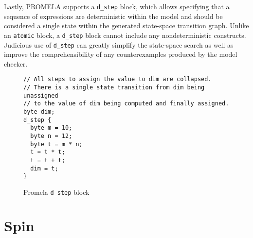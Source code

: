Lastly, PROMELA supports a \texttt{d\_step} block, which allows specifying that a sequence of expressions are deterministic within the model and should be considered a single state within the generated state-space transition graph.
Unlike an \texttt{atomic} block, a \texttt{d\_step} block cannot include any nondeterministic constructs.
Judicious use of \texttt{d\_step} can greatly simplify the state-space search as well as improve the comprehensibility of any counterexamples produced by the model checker.

\begin{figure}
\centering
\caption{Promela \texttt{d\_step} block}
\begin{verbatim}
// All steps to assign the value to dim are collapsed.
// There is a single state transition from dim being unassigned
// to the value of dim being computed and finally assigned.
byte dim;
d_step {
  byte m = 10;
  byte n = 12;
  byte t = m * n; 
  t = t * t;
  t = t + t;
  dim = t;
}
\end{verbatim}
\end{figure}


\hypertarget{spin}{%
\section{Spin}\label{spin}}

